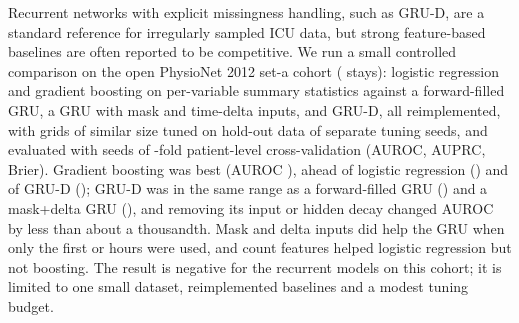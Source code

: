 Recurrent networks with explicit missingness handling, such as GRU-D, are a standard reference for irregularly sampled ICU data, but strong feature-based baselines are often reported to be competitive. We run a small controlled comparison on the open PhysioNet 2012 set-a cohort ( stays): logistic regression and gradient boosting on per-variable summary statistics against a forward-filled GRU, a GRU with mask and time-delta inputs, and GRU-D, all reimplemented, with grids of similar size tuned on hold-out data of separate tuning seeds, and evaluated with  seeds of -fold patient-level cross-validation (AUROC, AUPRC, Brier). Gradient boosting was best (AUROC ), ahead of logistic regression () and of GRU-D (); GRU-D was in the same range as a forward-filled GRU () and a mask+delta GRU (), and removing its input or hidden decay changed AUROC by less than about a thousandth. Mask and delta inputs did help the GRU when only the first  or  hours were used, and count features helped logistic regression but not boosting. The result is negative for the recurrent models on this cohort; it is limited to one small dataset, reimplemented baselines and a modest tuning budget.
